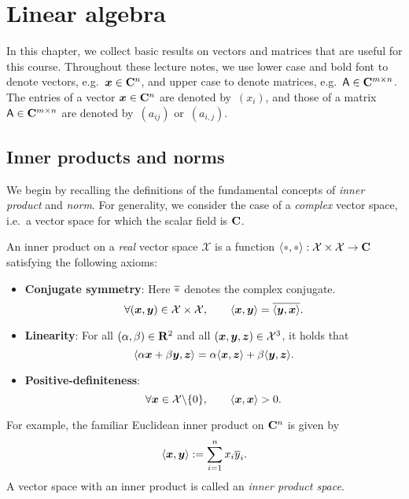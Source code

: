 \setlength{\OuterFrameSep}{0pt}

\chapter{Linear algebra}%
\label{cha:vectors_and_matrices}

In this chapter,
we collect basic results on vectors and matrices that are useful for this course.
Throughout these lecture notes,
we use lower case and bold font to denote vectors, e.g.\ $\mathbf{\boldsymbol{x}} \in \mathbf C^n$,
and upper case to denote matrices, e.g.\ $\mathsf A \in \mathbf C^{m \times n}$.
The entries of a vector $\mathbf{\boldsymbol{x}} \in \mathbf C^n$ are denoted by~$(x_i)$,
and those of a matrix $\mathsf A \in \mathbf C^{m \times n}$ are denoted by~$(a_{ij})$ or~$(a_{i,j})$.

\section{Inner products and norms}%
\label{sec:inner_product_and_norm}

We begin by recalling the definitions of the fundamental concepts of \emph{inner product} and \emph{norm}.
For generality,
we consider the case of a \emph{complex} vector space,
i.e.\ a vector space for which the scalar field is $\mathbf C$.
\begin{definition}
    An inner product on a \emph{real} vector space $\mathcal X$ is a function $\ip{\placeholder,\placeholder}: \mathcal X \times \mathcal X \to \complex$ satisfying the following axioms:
    \begin{itemize}
        \item
            \textbf{Conjugate symmetry}:
            Here $\overline \placeholder$ denotes the complex conjugate.
            \[
                \forall (\mathbf{\boldsymbol{x}}, \mathbf{\boldsymbol{y}}) \in \mathcal X \times \mathcal X, \qquad
                \langle\mathbf{\boldsymbol{x}}, \mathbf{\boldsymbol{y}}\rangle = \overline{\langle\mathbf{\boldsymbol{y}}, \mathbf{\boldsymbol{x}}\rangle}.
            \]
        \item
            \textbf{Linearity}:
            For all $(\alpha, \beta) \in \mathbf R^2$ and all $(\mathbf{\boldsymbol{x}}, \mathbf{\boldsymbol{y}}, \mathbf{\boldsymbol{z}}) \in \mathcal X^3$,
            it holds that
            \[
                \langle\alpha \mathbf{\boldsymbol{x}} + \beta \mathbf{\boldsymbol{y}}, \mathbf{\boldsymbol{z}}\rangle
                = \alpha \langle\mathbf{\boldsymbol{x}}, \mathbf{\boldsymbol{z}}\rangle + \beta \langle\mathbf{\boldsymbol{y}}, \mathbf{\boldsymbol{z}}\rangle.
            \]

        \item
            \textbf{Positive-definiteness}:
            \[
                \forall \mathbf{\boldsymbol{x}} \in \mathcal X \backslash \{0\}, \qquad
                \langle\mathbf{\boldsymbol{x}}, \mathbf{\boldsymbol{x}}\rangle > 0.
            \]
    \end{itemize}
\end{definition}
For example, the familiar Euclidean inner product on $\mathbf C^n$ is given by
\[
    \langle\mathbf{\boldsymbol{x}}, \mathbf{\boldsymbol{y}}\rangle := \sum_{i=1}^{n} x_i \overline y_i.
\]
A vector space with an inner product is called an \emph{inner product space}.

